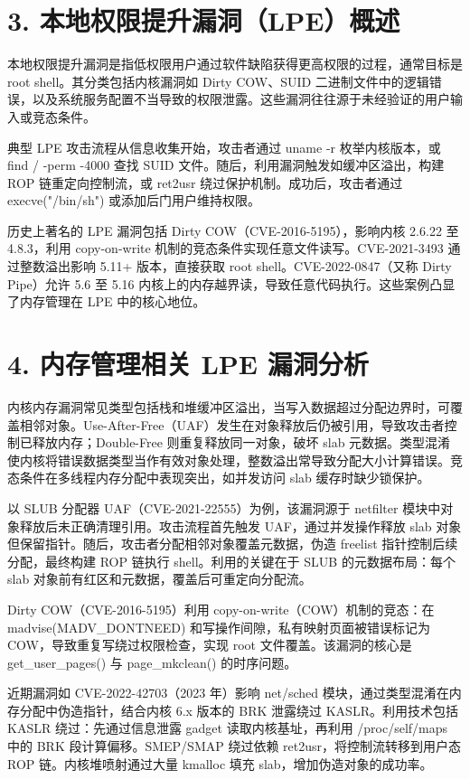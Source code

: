 \chapter{3. 本地权限提升漏洞（LPE）概述}
本地权限提升漏洞是指低权限用户通过软件缺陷获得更高权限的过程，通常目标是 root shell。其分类包括内核漏洞如 Dirty COW、SUID 二进制文件中的逻辑错误，以及系统服务配置不当导致的权限泄露。这些漏洞往往源于未经验证的用户输入或竞态条件。\par
典型 LPE 攻击流程从信息收集开始，攻击者通过 uname -r 枚举内核版本，或 find / -perm -4000 查找 SUID 文件。随后，利用漏洞触发如缓冲区溢出，构建 ROP 链重定向控制流，或 ret2usr 绕过保护机制。成功后，攻击者通过 execve("/bin/sh") 或添加后门用户维持权限。\par
历史上著名的 LPE 漏洞包括 Dirty COW（CVE-2016-5195），影响内核 2.6.22 至 4.8.3，利用 copy-on-write 机制的竞态条件实现任意文件读写。CVE-2021-3493 通过整数溢出影响 5.11+ 版本，直接获取 root shell。CVE-2022-0847（又称 Dirty Pipe）允许 5.6 至 5.16 内核上的内存越界读，导致任意代码执行。这些案例凸显了内存管理在 LPE 中的核心地位。\par
\chapter{4. 内存管理相关 LPE 漏洞分析}
内核内存漏洞常见类型包括栈和堆缓冲区溢出，当写入数据超过分配边界时，可覆盖相邻对象。Use-After-Free（UAF）发生在对象释放后仍被引用，导致攻击者控制已释放内存；Double-Free 则重复释放同一对象，破坏 slab 元数据。类型混淆使内核将错误数据类型当作有效对象处理，整数溢出常导致分配大小计算错误。竞态条件在多线程内存分配中表现突出，如并发访问 slab 缓存时缺少锁保护。\par
以 SLUB 分配器 UAF（CVE-2021-22555）为例，该漏洞源于 netfilter 模块中对象释放后未正确清理引用。攻击流程首先触发 UAF，通过并发操作释放 slab 对象但保留指针。随后，攻击者分配相邻对象覆盖元数据，伪造 freelist 指针控制后续分配，最终构建 ROP 链执行 shell。利用的关键在于 SLUB 的元数据布局：每个 slab 对象前有红区和元数据，覆盖后可重定向分配流。\par
Dirty COW（CVE-2016-5195）利用 copy-on-write（COW）机制的竞态：在 madvise(MADV\_{}DONTNEED) 和写操作间隙，私有映射页面被错误标记为 COW，导致重复写绕过权限检查，实现 root 文件覆盖。该漏洞的核心是 get\_{}user\_{}pages() 与 page\_{}mkclean() 的时序问题。\par
近期漏洞如 CVE-2022-42703（2023 年）影响 net/sched 模块，通过类型混淆在内存分配中伪造指针，结合内核 6.x 版本的 BRK 泄露绕过 KASLR。利用技术包括 KASLR 绕过：先通过信息泄露 gadget 读取内核基址，再利用 /proc/self/maps 中的 BRK 段计算偏移。SMEP/SMAP 绕过依赖 ret2usr，将控制流转移到用户态 ROP 链。内核堆喷射通过大量 kmalloc 填充 slab，增加伪造对象的成功率。\par

